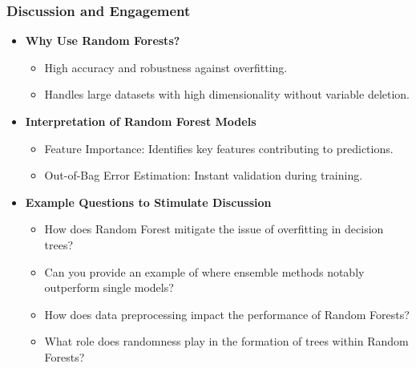 \documentclass[aspectratio=169]{beamer}
\begin{document}
\begin{frame}[fragile]
  \frametitle{Discussion and Engagement}
  \begin{itemize}
    \item \textbf{Why Use Random Forests?}
    \begin{itemize}
      \item High accuracy and robustness against overfitting.
      \item Handles large datasets with high dimensionality without variable deletion.
    \end{itemize}

    \item \textbf{Interpretation of Random Forest Models}
    \begin{itemize}
      \item Feature Importance: Identifies key features contributing to predictions.
      \item Out-of-Bag Error Estimation: Instant validation during training.
    \end{itemize}

    \item \textbf{Example Questions to Stimulate Discussion}
    \begin{itemize}
      \item How does Random Forest mitigate the issue of overfitting in decision trees?
      \item Can you provide an example of where ensemble methods notably outperform single models?
      \item How does data preprocessing impact the performance of Random Forests?
      \item What role does randomness play in the formation of trees within Random Forests?
    \end{itemize}
  \end{itemize}
\end{frame}
\end{document}
